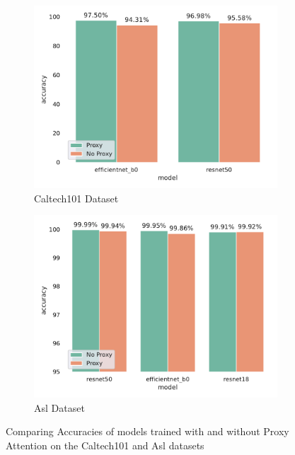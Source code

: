 \begin{figure}[!htb]
    \begin{subfigure}[h]{.5\textwidth}
        \includegraphics[width=\linewidth, right]{results/caltech101_results.pdf}
        \caption{Caltech101 Dataset}
    \end{subfigure}
    \begin{subfigure}[h]{.5\textwidth}
        \includegraphics[width=\linewidth, left]{results/asl_results.pdf}
        \caption{Asl Dataset}
    \end{subfigure}
    \caption{Comparing Accuracies of models trained with and without Proxy Attention on the Caltech101 and Asl datasets}
    \label{fig:caltech101_asl_results}
\end{figure}

